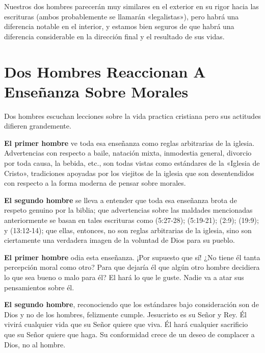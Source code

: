 \documentclass[12pt, twoside, openright]{book}
\begin{document}
Nuestros dos hombres parecerán muy similares en el exterior en su rigor hacia las escrituras (ambos probablemente se llamarán «legalistas»), pero habrá una diferencia notable en el interior, y estamos bien seguros de que habrá una diferencia considerable en la dirección final y el resultado de sus vidas. 

\section{Dos Hombres Reaccionan A Enseñanza Sobre Morales}
Dos hombres escuchan lecciones sobre la vida practica cristiana pero sus actitudes difieren grandemente. 

\textbf{El primer hombre} ve toda esa enseñanza como reglas arbitrarias de la iglesia. Advertencias con respecto a baile, natación mixta, inmodestia general, divorcio por toda causa, la bebida, etc., son todas vistas como estándares de la «Iglesia de Cristo», tradiciones apoyadas por los viejitos de la iglesia que son desentendidos con respecto a la forma moderna de pensar sobre morales. 

\textbf{El segundo hombre} se lleva a entender que toda esa enseñanza brota de respeto genuino por la biblia; que advertencias sobre las maldades mencionadas anteriormente se basan en tales escrituras como (5:27-28); (5:19-21); (2:9); (19:9); y (13:12-14); que ellas, entonces, no son reglas arbitrarias de la iglesia, sino son ciertamente una verdadera imagen de la voluntad de Dios para su pueblo. 

\textbf{El primer hombre} odia esta enseñanza. ¡Por supuesto que sí! ¿No tiene él tanta percepción moral como otro? Para que dejaría él que algún otro hombre decidiera lo que sea bueno o malo para él? El hará lo que le guste. Nadie va a atar sus pensamientos sobre él. 

\textbf{El segundo hombre}, reconociendo que los estándares bajo consideración son de Dios y no de los hombres, felizmente cumple. Jesucristo es su Señor y Rey. Él vivirá cualquier vida que su Señor quiere que viva. Él hará cualquier sacrificio que su Señor quiere que haga. Su conformidad crece de un deseo de complacer a Dios, no al hombre. 
\end{document}
